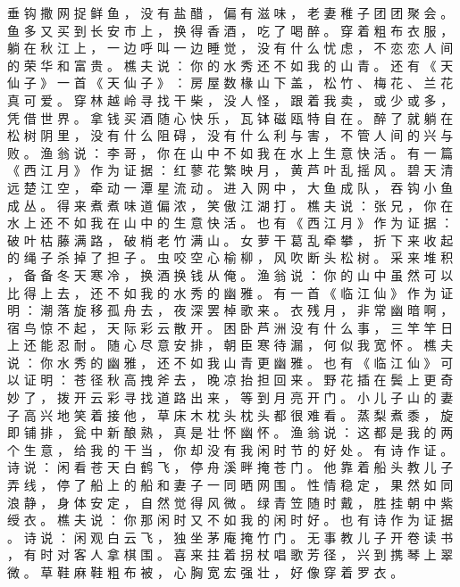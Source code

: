 {垂 钩 撒 网 捉 鲜 鱼 ， 没 有 盐 醋 ， 偏 有 滋 味 ， 老 妻 稚 子 团 团 聚 会 。
鱼 多 又 买 到 长 安 市 上 ， 换 得 香 酒 ， 吃 了 喝 醉 。
穿 着 粗 布 衣 服 ， 躺 在 秋 江 上 ， 一 边 呼 叫 一 边 睡 觉 ， 没 有 什 么 忧 虑 ， 不 恋 恋 人 间 的 荣 华 和 富 贵 。
樵 夫 说 ： 你 的 水 秀 还 不 如 我 的 山 青 。
还 有 《 天 仙 子 》 一 首 《 天 仙 子 》 ： 房 屋 数 椽 山 下 盖 ， 松 竹 、 梅 花 、 兰 花 真 可 爱 。
穿 林 越 岭 寻 找 干 柴 ， 没 人 怪 ， 跟 着 我 卖 ， 或 少 或 多 ， 凭 借 世 界 。
拿 钱 买 酒 随 心 快 乐 ， 瓦 钵 磁 瓯 特 自 在 。
醉 了 就 躺 在 松 树 阴 里 ， 没 有 什 么 阻 碍 ， 没 有 什 么 利 与 害 ， 不 管 人 间 的 兴 与 败 。
渔 翁 说 ： 李 哥 ， 你 在 山 中 不 如 我 在 水 上 生 意 快 活 。
有 一 篇 《 西 江 月 》 作 为 证 据 ： 红 蓼 花 繁 映 月 ， 黄 芦 叶 乱 摇 风 。
碧 天 清 远 楚 江 空 ， 牵 动 一 潭 星 流 动 。
进 入 网 中 ， 大 鱼 成 队 ， 吞 钩 小 鱼 成 丛 。
得 来 煮 煮 味 道 偏 浓 ， 笑 傲 江 湖 打 。
樵 夫 说 ： 张 兄 ， 你 在 水 上 还 不 如 我 在 山 中 的 生 意 快 活 。
也 有 《 西 江 月 》 作 为 证 据 ： 破 叶 枯 藤 满 路 ， 破 梢 老 竹 满 山 。
女 萝 干 葛 乱 牵 攀 ， 折 下 来 收 起 的 绳 子 杀 掉 了 担 子 。
虫 咬 空 心 榆 柳 ， 风 吹 断 头 松 树 。
采 来 堆 积 ， 备 备 冬 天 寒 冷 ， 换 酒 换 钱 从 俺 。
渔 翁 说 ： 你 的 山 中 虽 然 可 以 比 得 上 去 ， 还 不 如 我 的 水 秀 的 幽 雅 。
有 一 首 《 临 江 仙 》 作 为 证 明 ： 潮 落 旋 移 孤 舟 去 ， 夜 深 罢 棹 歌 来 。
衣 残 月 ， 非 常 幽 暗 啊 ， 宿 鸟 惊 不 起 ， 天 际 彩 云 散 开 。
困 卧 芦 洲 没 有 什 么 事 ， 三 竿 竿 日 上 还 能 忍 耐 。
随 心 尽 意 安 排 ， 朝 臣 寒 待 漏 ， 何 似 我 宽 怀 。
樵 夫 说 ： 你 水 秀 的 幽 雅 ， 还 不 如 我 山 青 更 幽 雅 。
也 有 《 临 江 仙 》 可 以 证 明 ： 苍 径 秋 高 拽 斧 去 ， 晚 凉 抬 担 回 来 。
野 花 插 在 鬓 上 更 奇 妙 了 ， 拨 开 云 彩 寻 找 道 路 出 来 ， 等 到 月 亮 开 门 。
小 儿 子 山 的 妻 子 高 兴 地 笑 着 接 他 ， 草 床 木 枕 头 枕 头 都 很 难 看 。
蒸 梨 煮 黍 ， 旋 即 铺 排 ， 瓮 中 新 酿 熟 ， 真 是 壮 怀 幽 怀 。
渔 翁 说 ： 这 都 是 我 的 两 个 生 意 ， 给 我 的 干 当 ， 你 却 没 有 我 闲 时 节 的 好 处 。
有 诗 作 证 。
诗 说 ： 闲 看 苍 天 白 鹤 飞 ， 停 舟 溪 畔 掩 苍 门 。
他 靠 着 船 头 教 儿 子 弄 线 ， 停 了 船 上 的 船 和 妻 子 一 同 晒 网 围 。
性 情 稳 定 ， 果 然 如 同 浪 静 ， 身 体 安 定 ， 自 然 觉 得 风 微 。
绿 青 笠 随 时 戴 ， 胜 挂 朝 中 紫 绶 衣 。
樵 夫 说 ： 你 那 闲 时 又 不 如 我 的 闲 时 好 。
也 有 诗 作 为 证 据 。
诗 说 ： 闲 观 白 云 飞 ， 独 坐 茅 庵 掩 竹 门 。
无 事 教 儿 子 开 卷 读 书 ， 有 时 对 客 人 拿 棋 围 。
喜 来 拄 着 拐 杖 唱 歌 芳 径 ， 兴 到 携 琴 上 翠 微 。
草 鞋 麻 鞋 粗 布 被 ， 心 胸 宽 宏 强 壮 ， 好 像 穿 着 罗 衣 。
}
